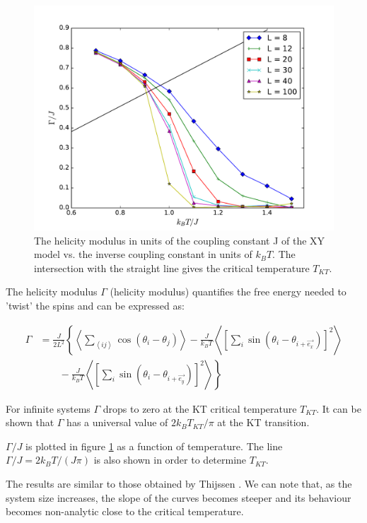 \documentclass[twoside]{article}
\def\mean#1{\left< #1 \right>}
\begin{document}
\begin{multicols}{2}
\begin{figure}[H]
\centering
\includegraphics[scale=0.4]{images/helicity_modulus.pdf}
\caption{The helicity modulus in units of the coupling constant J of the XY model vs. the inverse coupling constant in units of $k_B T$. The intersection with the straight line gives the critical temperature $T_{KT}$.}
\label{helicity_modulus_fig}
\end{figure}

The helicity modulus $\Gamma$ (helicity modulus) quantifies the free energy needed to 'twist' the spins and can be expressed as:

\begin{align}
\Gamma &= \frac{J}{2L^2}\left\{ \mean{\sum_{\mean{ij}} \cos(\theta_i - \theta_j)} - \frac{J}{k_B T} \mean{\left[ \sum_i \sin( \theta_i - \theta_{i+ \vec{e_x}}) \right]^2}\right.\nonumber \\
 &\qquad \left. {}  - \frac{J}{k_B T} \mean{\left[ \sum_i \sin( \theta_i - \theta_{i+ \vec{e_y}}) \right]^2} \right\}
\end{align}


For infinite systems $\Gamma$ drops to zero at the KT critical temperature $T_{KT}$. It can be shown \cite{thijssen} that  $\Gamma$ has a universal value of $2k_B T_{KT}/\pi$ at the KT transition.

$\Gamma/J$ is plotted in figure \ref{helicity_modulus_fig} as a function of temperature. The line $ \Gamma/J = 2k_B T/(J \pi)$ is also shown in order to determine $T_{KT}$.

The results are similar to those obtained by Thijssen \cite{thijssen}. We can note that, as the system size increases, the slope of the curves becomes steeper and its behaviour becomes non-analytic close to the critical temperature.


\end{multicols}
\end{document}
